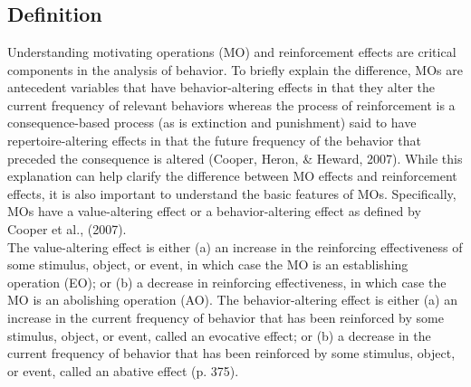 \clearpage \section[\fourFKThirty{}]{\fourFKThirty{}%
              }
\subsection{Definition}
Understanding motivating operations (MO) and reinforcement effects are critical components in the analysis of behavior.  To briefly explain the difference, MOs are antecedent variables that have behavior-altering effects in that they alter the current frequency of relevant behaviors whereas the process of reinforcement is a consequence-based process (as is extinction and punishment) said to have repertoire-altering effects in that the future frequency of the behavior that preceded the consequence is altered (Cooper, Heron, \& Heward, 2007).  While this explanation can help clarify the difference between MO effects and reinforcement effects, it is also important to understand the basic features of MOs.  Specifically, MOs have a value-altering effect or a behavior-altering effect as defined by Cooper et al., (2007).\\

The value-altering effect is either (a) an increase in the reinforcing effectiveness of some stimulus, object, or event, in which case the MO is an establishing operation (EO); or (b) a decrease in reinforcing effectiveness, in which case the MO is an abolishing operation (AO).  The behavior-altering effect is either (a) an increase in the current frequency of behavior that has been reinforced by some stimulus, object, or event, called an evocative effect; or (b) a decrease in the current frequency of behavior that has been reinforced by some stimulus, object, or event, called an abative effect (p. 375).
%

